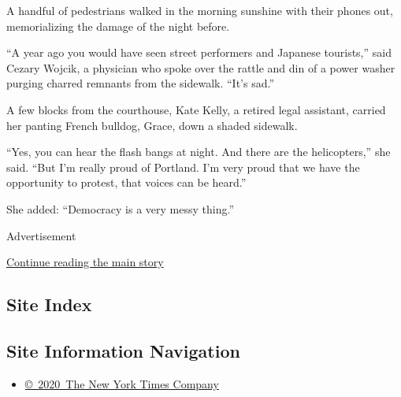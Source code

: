 A handful of pedestrians walked in the morning sunshine with their
phones out, memorializing the damage of the night before.

``A year ago you would have seen street performers and Japanese
tourists,'' said Cezary Wojcik, a physician who spoke over the rattle
and din of a power washer purging charred remnants from the sidewalk.
``It's sad.''

A few blocks from the courthouse, Kate Kelly, a retired legal assistant,
carried her panting French bulldog, Grace, down a shaded sidewalk.

``Yes, you can hear the flash bangs at night. And there are the
helicopters,'' she said. ``But I'm really proud of Portland. I'm very
proud that we have the opportunity to protest, that voices can be
heard.''

She added: ``Democracy is a very messy thing.''

Advertisement

\protect\hyperlink{after-bottom}{Continue reading the main story}

\hypertarget{site-index}{%
\subsection{Site Index}\label{site-index}}

\hypertarget{site-information-navigation}{%
\subsection{Site Information
Navigation}\label{site-information-navigation}}

\begin{itemize}
\tightlist
\item
  \href{https://help.nytimes.com/hc/en-us/articles/115014792127-Copyright-notice}{©~2020~The
  New York Times Company}
\end{itemize}

